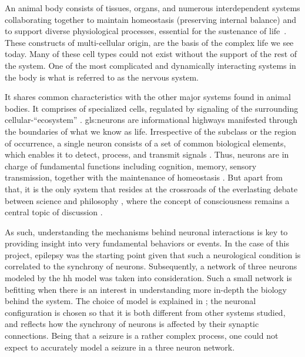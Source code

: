 \documentclass[class={myRUCProject}, crop=false]{standalone}
\begin{document}
An animal body consists of tissues, organs, and numerous interdependent systems collaborating together to maintain homeostasis (preserving internal balance) and to support diverse physiological processes, essential for the sustenance of life~\cite{inbook2023Com}. 
These constructs of multi-cellular origin, are the basis of the complex life we see today. Many of these cell types could not exist without the support of the rest of the system. 
One of the most complicated and dynamically interacting systems in the body is what is referred to as the nervous system.


It shares common characteristics with the other major systems found in animal bodies. 
It comprises of specialized cells, regulated by signaling of the surrounding cellular-``ecosystem'' \cite{SHOYKHET2011783}. 
\Glspl{gls:neuron} are informational highways manifested through the boundaries of what we know as life. 
Irrespective of the subclass or the region of occurrence, a single neuron consists of a set of common biological elements, which enables it to detect, process, and transmit signals \cite{SHOYKHET2011783}. 
Thus, neurons are in charge of fundamental functions including cognition, memory, sensory transmission, together with the maintenance of homeostasis .
But apart from that, it is the only system that resides at the crossroads of the everlasting debate between science and philosophy \cite{SHOYKHET2011783, cons2002}, where the concept of consciousness remains a central topic of discussion \cite{cons2002}. 

As such, understanding the mechanisms behind neuronal interactions is key to providing insight into very fundamental behaviors or events. 
In the case of this project, epilepsy was the starting point given that such a neurological condition is correlated to the synchrony of neurons. 
Subsequently, a network of three neurons modeled by the \gls{hh} model was taken into consideration. 
Such a small network is befitting when there is an interest in understanding more in-depth the biology behind the system. The choice of model is explained in ; the neuronal configuration is chosen so that it is both {different from other systems studied}, and {reflects how the synchrony of neurons is affected by their synaptic connections}.
Being that a seizure is a rather complex process, one could not expect to accurately model a seizure in a three neuron network. 
\end{document}
